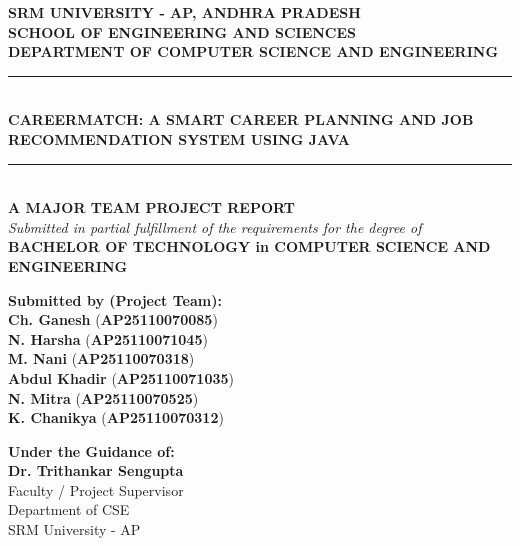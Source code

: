\documentclass[11pt,a4paper]{report}
\begin{document}
\begin{titlepage}
    \centering
    \vspace*{0.2cm}
    
    {\Large \textbf{SRM UNIVERSITY - AP, ANDHRA PRADESH}}\\[0.2cm]
    {\normalsize \textbf{SCHOOL OF ENGINEERING AND SCIENCES}}\\[0.15cm]
    {\normalsize \textbf{DEPARTMENT OF COMPUTER SCIENCE AND ENGINEERING}}\\[0.6cm]

    \rule{\linewidth}{1.2pt}\\[0.3cm]
    {\LARGE \textbf{CAREERMATCH: A SMART CAREER PLANNING AND JOB RECOMMENDATION SYSTEM USING JAVA}}\\[0.3cm]
    \rule{\linewidth}{1.2pt}\\[0.6cm]

    {\large \textbf{A MAJOR TEAM PROJECT REPORT}}\\[0.15cm]
    {\normalsize \textit{Submitted in partial fulfillment of the requirements for the degree of}}\\[0.15cm]
    {\large \textbf{BACHELOR OF TECHNOLOGY in COMPUTER SCIENCE AND ENGINEERING}}\\[0.6cm]

    \begin{minipage}{0.55\textwidth}
        \begin{flushleft} \normalsize
            \textbf{Submitted by (Project Team):}\\[0.15cm]
            \textbf{Ch. Ganesh} \hfill (\textbf{AP25110070085})\\
            \textbf{N. Harsha} \hfill (\textbf{AP25110071045})\\
            \textbf{M. Nani} \hfill (\textbf{AP25110070318})\\
            \textbf{Abdul Khadir} \hfill (\textbf{AP25110071035})\\
            \textbf{N. Mitra} \hfill (\textbf{AP25110070525})\\
            \textbf{K. Chanikya} \hfill (\textbf{AP25110070312})
        \end{flushleft}
    \end{minipage}
    \hfill
    \begin{minipage}{0.42\textwidth}
        \begin{flushright} \normalsize
            \textbf{Under the Guidance of:}\\[0.15cm]
            {\large \textbf{Dr. Trithankar Sengupta}}\\[0.1cm]
            Faculty / Project Supervisor\\
            Department of CSE\\
            SRM University - AP
        \end{flushright}
    \end{minipage}


\end{titlepage}
\end{document}
